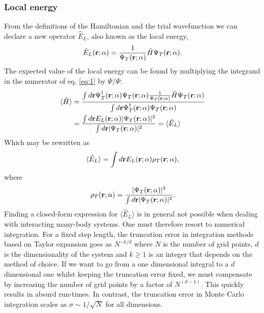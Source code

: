 \documentclass[
    a4paper, aps, twocolumn, floatfix, superscriptaddress,
    nofootinbib]{revtex4-1}
\begin{document}
\subsubsection{Local energy} From the definitions of the Hamiltonian and the trial wavefunction we can declare a new operator $\hat{E}_L$, also known as the local energy,
\begin{align}
    \hat{E}_L(\bold r; \alpha) = \frac{1}{\Psi_T(\bold r; \alpha)}\hat{H}\Psi_T(\bold r; \alpha). \label{eq:local_energy}
\end{align}
The expected value of the local energy can be found by multiplying the integrand in the numerator of eq, \eqref{eq:1} by $\Psi/\Psi$: 
\begin{align}
    \langle \hat{H} \rangle &= \frac{\int d\bold r \Psi_T^\dagger(\bold r; \alpha) \Psi_T(\bold r; \alpha) \frac{1}{\Psi_T(\bold r; \alpha)} \hat{H} \Psi_T(\bold r; \alpha)}{\int d\bold r \Psi_T^\dagger(\bold r; \alpha) \Psi_T(\bold r; \alpha)}\\
    &= \frac{\int d\bold r E_L(\bold r; \alpha) |\Psi_T(\bold r; \alpha)|^2}{\int d\bold r |\Psi_T(\bold r; \alpha)|^2} = \langle \hat{E}_L \rangle
\end{align}
Which may be rewritten as 
\begin{equation}
    \langle \hat{E}_L \rangle = \int d\bold r E_L(\bold r; \alpha) \rho_T(\bold r; \alpha),
\end{equation}
where 
\begin{equation}\label{eq:7}
    \rho_T(\bold r; \alpha) = \frac{ |\Psi_T(\bold r; \alpha)|^2}{\int d\bold r |\Psi_T(\bold r; \alpha)|^2}.
\end{equation}
Finding a closed-form expression for $\langle \hat{E}_L \rangle$ is in general not possible when dealing with interacting many-body systems. One must therefore resort to numerical integration. For a fixed step length, the truncation error in integration methods based on Taylor expansion goes as $N^{-k/d}$ where $N$ is the number of grid points,  $d$ is the dimensionality of the system and $k \geq 1$ is an integer that depends on the method of choice. If we want to go from a  one dimensional integral to a $d$ dimensional one whilst keeping the truncation error fixed, we must compensate by increasing the number of grid points by a factor of $N^{(d-1)}$. This quickly results in absurd run-times.
In contrast, the truncation error in Monte Carlo integration scales as $\sigma \sim 1/\sqrt{N}$ for all dimensions. 
\end{document}
